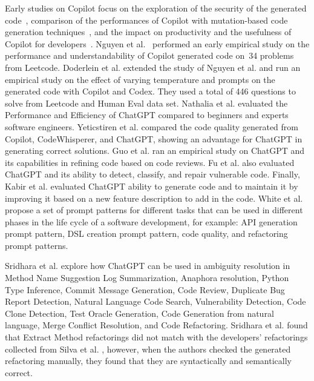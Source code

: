   Early studies on Copilot focus on the exploration of the security of the generated code~\cite{pearce2022asleep}, comparison of the performances of Copilot with mutation-based code generation techniques~\cite{sobania2022choose}, and  the impact on productivity and the usefulness of Copilot for developers~\cite{ziegler2022productivity,vaithilingam2022expectation}.
  Nguyen et al.~\cite{nguyen2022empirical} performed an early empirical study on the performance and understandability of Copilot generated code on~34 problems from Leetcode. 
  Doderlein et al. \cite{doderlein2022piloting} extended the study of Nguyen et al. \cite{nguyen2022empirical} and run an empirical study on the effect of varying temperature and prompts on the generated code with Copilot and Codex. They used a total of 446 questions to solve from Leetcode and Human Eval data set.  
  Nathalia et al. \cite{nathalia2023artificial} evaluated the Performance and Efficiency of ChatGPT compared to beginners and experts software engineers. 
  Yeticstiren et al. \cite{yeticstiren2023evaluating} compared the code quality generated from Copilot, CodeWhisperer, and ChatGPT, showing an advantage for ChatGPT in generating correct solutions. 
  Guo et al. \cite{guo2023exploring} ran an empirical study on ChatGPT and its capabilities in refining code based on code reviews. 
  Fu et al. \cite{fu2023chatgpt} also evaluated ChatGPT and its ability to detect, classify, and repair vulnerable code. 
  Finally, Kabir et al. \cite{kabir2023empirical} evaluated ChatGPT ability to generate code and to maintain it by improving it based on a new feature description to add in the code. 
 White et al. \cite{White2024} propose a set of prompt patterns for different tasks that can be used in different phases in the life cycle of a software development, for example: API generation prompt pattern, DSL creation prompt pattern, code quality, and refactoring prompt patterns.
  
Sridhara et al. \cite{sridhara2023chatgpt} explore how ChatGPT can be used in ambiguity resolution in Method Name Suggestion
   Log Summarization, Anaphora resolution, Python Type Inference,  Commit Message Generation, Code Review, Duplicate Bug Report Detection, Natural Language Code Search, Vulnerability Detection, Code Clone Detection, Test Oracle Generation, Code Generation from natural language, Merge Conflict Resolution, and Code Refactoring. Sridhara et al. \cite{sridhara2023chatgpt} found that Extract Method refactorings did not match with the developers' refactorings collected from Silva et al. \cite{10.1145/2950290.2950305}, however, when the authors checked the generated refactoring manually, they found that they are syntactically and semantically correct.

